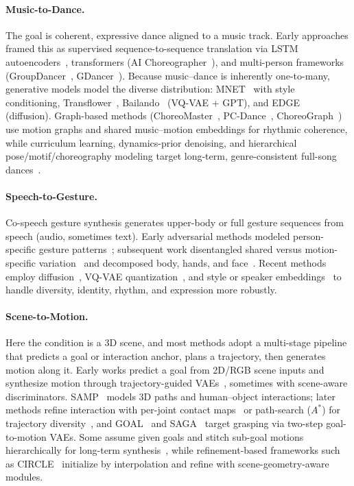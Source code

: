 \paragraph{Music-to-Dance.} The goal is coherent, expressive dance aligned to a music track. Early approaches framed this as supervised sequence-to-sequence translation via LSTM autoencoders~\cite{TangJM18}, transformers (AI Choreographer~\cite{LiYRK21}), and multi-person frameworks (GroupDancer~\cite{Wang0WXCMCW22}, GDancer~\cite{LePDTT023}).
Because music--dance is inherently one-to-many, generative models model the diverse distribution: MNET~\cite{0001OKT022} with style conditioning, Transflower~\cite{PerezHBHOA21}, Bailando~\cite{SiyaoYGLW0L022} (VQ-VAE + GPT), and EDGE~\cite{TsengCL23} (diffusion). Graph-based methods (ChoreoMaster~\cite{ChenTLZGZ021}, PC-Dance~\cite{GaoPZSZ22}, ChoreoGraph~\cite{AuCJG22}) use motion graphs and shared music--motion embeddings for rhythmic coherence, while curriculum learning, dynamics-prior denoising, and hierarchical pose/motif/choreography modeling target long-term, genre-consistent full-song dances~\cite{HuangHWSZJ21, SunWHLJH22, AristidouYACSC23}.

\paragraph{Speech-to-Gesture.} Co-speech gesture synthesis generates upper-body or full gesture sequences from speech (audio, sometimes text).
Early adversarial methods modeled person-specific gesture patterns~\cite{GinosarBKCOM19}; subsequent work disentangled shared versus motion-specific variation~\cite{KucherenkoHHKK19} and decomposed body, hands, and face~\cite{HabibieXMLSPET21}.
Recent methods employ diffusion~\cite{ZhuLLQLY23, AlexandersonNBH23, AoZL23}, VQ-VAE quantization~\cite{YiLLCWBTB23}, and style or speaker embeddings~\cite{AhujaLNM20} to handle diversity, identity, rhythm, and expression more robustly.

\paragraph{Scene-to-Motion.} Here the condition is a 3D scene, and most methods adopt a multi-stage pipeline that predicts a goal or interaction anchor, plans a trajectory, then generates motion along it. Early works predict a goal from 2D/RGB scene inputs and synthesize motion through trajectory-guided VAEs~\cite{CaoGMCVM20, WangYDL21}, sometimes with scene-aware discriminators. SAMP~\cite{HassanCVSYZB21} models 3D paths and human--object interactions; later methods refine interaction with per-joint contact maps~\cite{D00010HS22} or path-search ($A^\ast$) for trajectory diversity~\cite{0003RLYLD22}, and GOAL~\cite{TaheriCBT22} and SAGA~\cite{WuWZZHYT22} target grasping via two-step goal-to-motion VAEs.
Some assume given goals and stitch sub-goal motions hierarchically for long-term synthesis~\cite{WangXXL021}, while refinement-based frameworks such as CIRCLE~\cite{AraujoLVAWGCL23} initialize by interpolation and refine with scene-geometry-aware modules.


